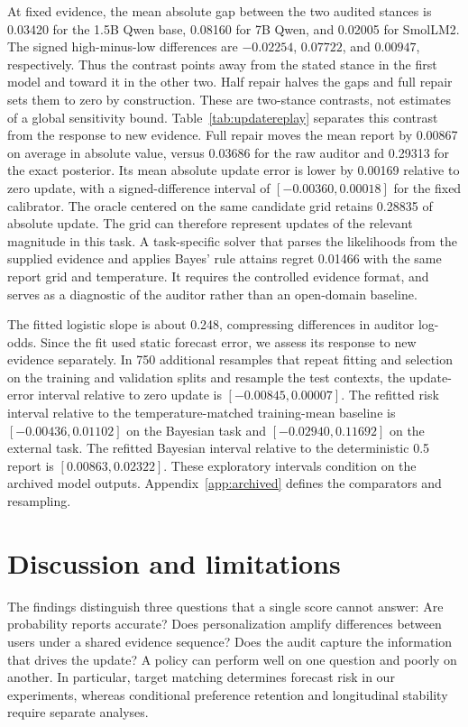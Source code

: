 \documentclass[10pt]{article}
\begin{document}
At fixed evidence, the mean absolute gap between the two audited stances
is 0.03420 for the 1.5B Qwen base, 0.08160 for 7B Qwen, and 0.02005 for
SmolLM2. The signed high-minus-low differences are $-0.02254$,
$0.07722$, and $0.00947$, respectively. Thus the contrast points
away from the stated stance in the first model and toward it in the
other two. Half repair halves the gaps and full repair sets them to zero
by construction. These are two-stance contrasts, not estimates of a
global sensitivity bound. Table~\ref{tab:updatereplay} separates this
contrast from the response to new evidence. Full repair moves the
mean report by 0.00867 on average in absolute value, versus 0.03686
for the raw auditor and 0.29313 for the exact posterior.
Its mean absolute update error is lower by 0.00169 relative to zero update,
with a signed-difference interval of $[-0.00360,0.00018]$ for the fixed calibrator.
The oracle centered on the same candidate grid retains 0.28835 of
absolute update. The grid can therefore represent updates of the
relevant magnitude in this task.
A task-specific solver that parses the likelihoods from the supplied
evidence and applies Bayes' rule attains regret 0.01466 with the same
report grid and temperature. It requires the controlled evidence
format, and serves as a diagnostic of the auditor rather than an
open-domain baseline.

The fitted logistic slope is about 0.248, compressing differences in
auditor log-odds. Since the fit used static forecast error, we assess
its response to new evidence separately. In 750 additional resamples
that repeat fitting and selection on the training and validation splits
and resample the test contexts, the update-error interval relative to
zero update is $[-0.00845,0.00007]$. The refitted risk interval relative
to the temperature-matched training-mean baseline is
$[-0.00436,0.01102]$ on the Bayesian task and
$[-0.02940,0.11692]$ on the external task. The refitted Bayesian
interval relative to the deterministic 0.5 report is $[0.00863,0.02322]$.
These exploratory intervals condition on the archived model outputs.
Appendix~\ref{app:archived} defines the comparators and resampling.

\section{Discussion and limitations}
The findings distinguish three questions that a single score cannot answer:
Are probability reports accurate? Does personalization amplify differences
between users under a shared evidence sequence? Does the audit capture the
information that drives the update? A policy can perform well on one
question and poorly on another. In particular, target matching determines
forecast risk in our experiments, whereas conditional preference retention
and longitudinal stability require separate analyses.
\end{document}
